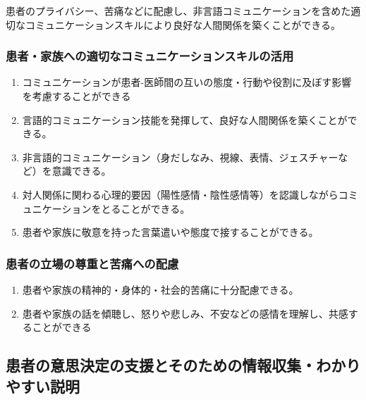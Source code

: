 \documentclass[
]{ltjsarticle}
\providecommand{\tightlist}{%
  \setlength{\itemsep}{0pt}\setlength{\parskip}{0pt}}
\begin{document}
患者のプライバシー、苦痛などに配慮し、非言語コミュニケーションを含めた適切なコミュニケーションスキルにより良好な人間関係を築くことができる。

\hypertarget{ux60a3ux8005ux5bb6ux65cfux3078ux306eux9069ux5207ux306aux30b3ux30dfux30e5ux30cbux30b1ux30fcux30b7ux30e7ux30f3ux30b9ux30adux30ebux306eux6d3bux7528}{%
\subsubsection{患者・家族への適切なコミュニケーションスキルの活用}\label{ux60a3ux8005ux5bb6ux65cfux3078ux306eux9069ux5207ux306aux30b3ux30dfux30e5ux30cbux30b1ux30fcux30b7ux30e7ux30f3ux30b9ux30adux30ebux306eux6d3bux7528}}

\begin{enumerate}
\def\labelenumi{\arabic{enumi}.}
\tightlist
\item
  コミュニケーションが患者-医師間の互いの態度・行動や役割に及ぼす影響を考慮することができる
\item
  言語的コミュニケーション技能を発揮して、良好な人間関係を築くことができる。
\item
  非言語的コミュニケーション（身だしなみ、視線、表情、ジェスチャーなど）を意識できる。
\item
  対人関係に関わる心理的要因（陽性感情・陰性感情等）を認識しながらコミュニケーションをとることができる。
\item
  患者や家族に敬意を持った言葉遣いや態度で接することができる。
\end{enumerate}

\hypertarget{ux60a3ux8005ux306eux7acbux5834ux306eux5c0aux91cdux3068ux82e6ux75dbux3078ux306eux914dux616e}{%
\subsubsection{患者の立場の尊重と苦痛への配慮}\label{ux60a3ux8005ux306eux7acbux5834ux306eux5c0aux91cdux3068ux82e6ux75dbux3078ux306eux914dux616e}}

\begin{enumerate}
\def\labelenumi{\arabic{enumi}.}
\tightlist
\item
  患者や家族の精神的・身体的・社会的苦痛に十分配慮できる。
\item
  患者や家族の話を傾聴し、怒りや悲しみ、不安などの感情を理解し、共感することができる
\end{enumerate}

\hypertarget{ux60a3ux8005ux306eux610fux601dux6c7aux5b9aux306eux652fux63f4ux3068ux305dux306eux305fux3081ux306eux60c5ux5831ux53ceux96c6ux308fux304bux308aux3084ux3059ux3044ux8aacux660e}{%
\subsection{患者の意思決定の支援とそのための情報収集・わかりやすい説明}\label{ux60a3ux8005ux306eux610fux601dux6c7aux5b9aux306eux652fux63f4ux3068ux305dux306eux305fux3081ux306eux60c5ux5831ux53ceux96c6ux308fux304bux308aux3084ux3059ux3044ux8aacux660e}}
\end{document}
